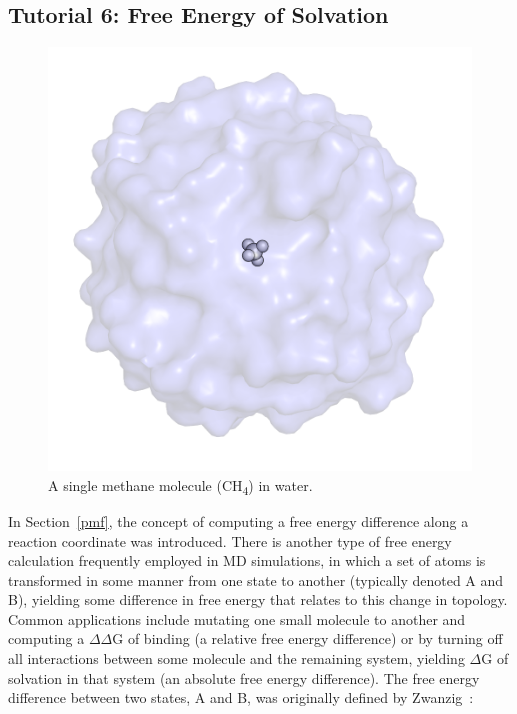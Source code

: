 \documentclass[9pt,tutorial,pubversion]{livecoms}
\begin{document}
\subsection{Tutorial 6: Free Energy of Solvation} \label{fes}

\begin{figure}[H]
\centering
\includegraphics{free_energy_methane_water}
\caption{A single methane molecule (CH\textsubscript{4}) in water.}
\label{free_energy_methane_water_fig}
\end{figure}

In Section~\ref{pmf}, the concept of computing a free energy difference along a reaction coordinate was introduced. There is another type of free energy calculation frequently employed in MD simulations, in which a set of atoms is transformed in some manner from one state to another (typically denoted A and B), yielding some difference in free energy that relates to this change in topology. Common applications include mutating one small molecule to another and computing a $\Delta\Delta$G of binding (a relative free energy difference) or by turning off all interactions between some molecule and the remaining system, yielding $\Delta$G of solvation in that system (an absolute free energy difference). The free energy difference between two states, A and B, was originally defined by Zwanzig~\cite{Zwanzig1954}:
\end{document}
